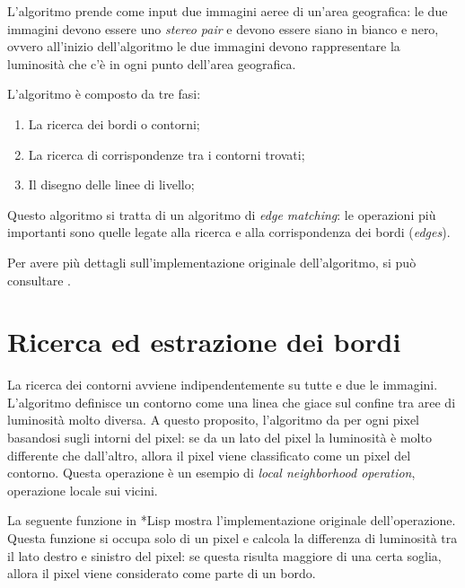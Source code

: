 \documentclass[12pt,a4paper,openright,twoside]{report}
\begin{document}
L'algoritmo prende come input due immagini aeree di un'area geografica: le due immagini devono essere uno \textit{stereo pair} e devono essere siano in bianco e nero, ovvero all'inizio dell'algoritmo le due immagini devono rappresentare la luminosità che c'è in ogni punto dell'area geografica.

L'algoritmo è composto da tre fasi:

\begin{enumerate}
    \item La ricerca dei bordi o contorni;
    \item La ricerca di corrispondenze tra i contorni trovati;
    \item Il disegno delle linee di livello;
\end{enumerate}

Questo algoritmo si tratta di un algoritmo di \textit{edge matching}: le operazioni più importanti sono quelle legate alla ricerca e alla corrispondenza dei bordi (\textit{edges}).

Per avere più dettagli sull'implementazione originale dell'algoritmo, si può consultare \cite{originalalgo}.

\section{Ricerca ed estrazione dei bordi}

La ricerca dei contorni avviene indipendentemente su tutte e due le immagini. L'algoritmo definisce un contorno come una linea che giace sul confine tra aree di luminosità molto diversa. A questo proposito, l'algoritmo da per ogni pixel basandosi sugli intorni del pixel: se da un lato del pixel la luminosità è molto differente che dall'altro, allora il pixel viene classificato come un pixel del contorno. Questa operazione è un esempio di \textit{local neighborhood operation}, operazione locale sui vicini.

La seguente funzione in *Lisp mostra l'implementazione originale dell'operazione. Questa funzione si occupa solo di un pixel e calcola la differenza di luminosità tra il lato destro e sinistro del pixel: se questa risulta maggiore di una certa soglia, allora il pixel viene considerato come parte di un bordo.
\end{document}
